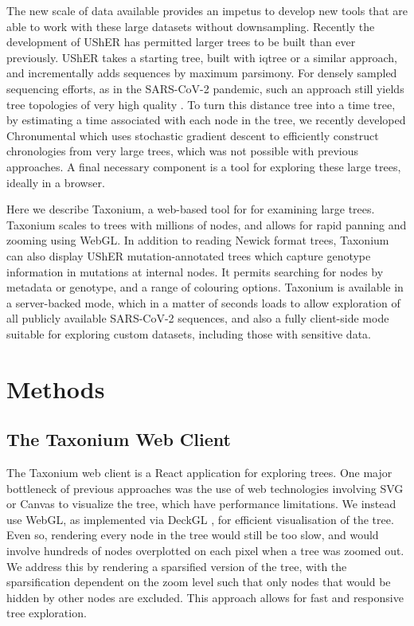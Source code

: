 The new scale of data available provides an impetus to develop new tools that are able to work with these large datasets without downsampling. Recently the development of UShER \citep{usher} has permitted larger trees to be built than ever previously. UShER takes a starting tree, built with iqtree or a similar approach, and incrementally adds sequences by maximum parsimony. For densely sampled sequencing efforts, as in the SARS-CoV-2 pandemic, such an approach still yields tree topologies of very high quality \citep{Thornlow2021.12.02.471004}. To turn this distance tree into a time tree, by estimating a time associated with each node in the tree, we recently developed Chronumental \citep{chronumental} which uses stochastic gradient descent to efficiently construct chronologies from very large trees, which was not possible with previous approaches. A final necessary component is a tool for exploring these large trees, ideally in a browser.

Here we describe Taxonium, a web-based tool for for examining large trees. Taxonium scales to trees with millions of nodes, and allows for rapid panning and zooming using WebGL. In addition to reading Newick format trees, Taxonium can also display UShER mutation-annotated trees which capture genotype information in mutations at internal nodes. It permits searching for nodes by metadata or genotype, and a range of colouring options. Taxonium is available in a server-backed mode, which in a matter of seconds loads to allow exploration of all publicly available SARS-CoV-2 sequences, and also a fully client-side mode suitable for exploring custom datasets, including those with sensitive data.


\section*{Methods}\label{s:results}

\subsection*{The Taxonium Web Client}

The Taxonium web client is a React application for exploring trees. One major bottleneck of previous approaches was the use of web technologies involving SVG or Canvas to visualize the tree, which have performance limitations. We instead use WebGL, as implemented via DeckGL \citep{deckgl}, for efficient visualisation of the tree. Even so, rendering every node in the tree would still be too slow, and would involve hundreds of nodes overplotted on each pixel when a tree was zoomed out. We address this by rendering a sparsified version of the tree, with the sparsification dependent on the zoom level such that only nodes that would be hidden by other nodes are excluded. This approach allows for fast and responsive tree exploration.

